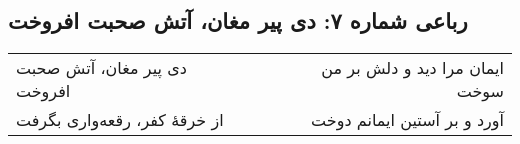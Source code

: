 \begin{center}
\section*{رباعی شماره ۷: دی پیر مغان، آتش صحبت افروخت}
\label{sec:007}
\begin{longtable}{l p{0.5cm} r}
دی پیر مغان، آتش صحبت افروخت
&&
ایمان مرا دید و دلش بر من سوخت
\\
از خرقهٔ کفر، رقعه‌واری بگرفت
&&
آورد و بر آستین ایمانم دوخت
\\
\end{longtable}
\end{center}
